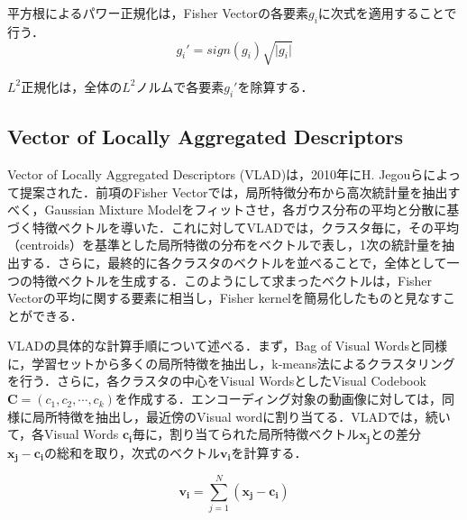 平方根によるパワー正規化は，Fisher Vectorの各要素$ g_i $に次式を適用することで行う．
\begin{equation}
{ {g_i}' = sign(g_i)\sqrt{\lvert{g_i}\rvert} }
\end{equation}

$ L^2 $正規化は，全体の$ L^2 $ノルムで各要素$ {g_i}' $を除算する．

\subsection{Vector of Locally Aggregated Descriptors}
Vector of Locally Aggregated Descriptors (VLAD)は，2010年にH. Jegouらによって提案された\cite{vlad}．前項のFisher Vectorでは，局所特徴分布から高次統計量を抽出すべく，Gaussian Mixture Modelをフィットさせ，各ガウス分布の平均と分散に基づく特徴ベクトルを導いた．これに対してVLADでは，クラスタ毎に，その平均（centroids）を基準とした局所特徴の分布をベクトルで表し，1次の統計量を抽出する．さらに，最終的に各クラスタのベクトルを並べることで，全体として一つの特徴ベクトルを生成する．このようにして求まったベクトルは，Fisher Vectorの平均に関する要素に相当し，Fisher kernelを簡易化したものと見なすことができる．

VLADの具体的な計算手順について述べる．まず，Bag of Visual Wordsと同様に，学習セットから多くの局所特徴を抽出し，k-means法によるクラスタリングを行う．さらに，各クラスタの中心をVisual WordsとしたVisual Codebook $ \bm{C} = (c_1, c_2, \cdots, c_k) $を作成する．エンコーディング対象の動画像に対しては，同様に局所特徴を抽出し，最近傍のVisual wordに割り当てる．VLADでは，続いて，各Visual Words $ \bm{c_i} $毎に，割り当てられた局所特徴ベクトル$ \bm{x_j} $との差分 $ \bm{x_j} - \bm{c_i} $の総和を取り，次式のベクトル$ \bm{v_i} $を計算する．

\begin{equation}
{ \bm{v_i} = \sum_{j=1}^{N} (\bm{x_j} - \bm{c_i}) }
\end{equation}

